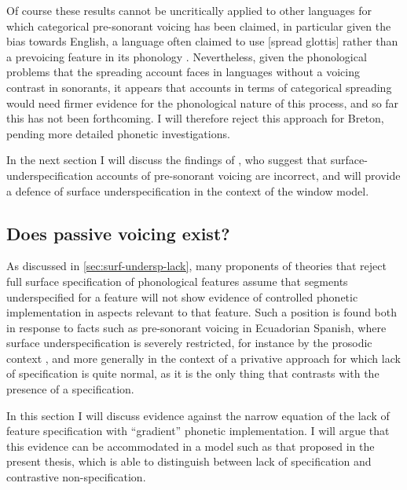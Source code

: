 Of course these results cannot be uncritically applied to other languages for which categorical pre-sonorant voicing has been claimed, in particular given the bias towards English, a language often claimed to use [spread glottis] rather than a prevoicing feature in its phonology \citep[the literature is vast, but \cfm][]{honeybone05,honeyboneng:_lenit_englis,iverson99:_laryn_german,goblirsch05:_lautv_sprac}. Nevertheless, given the phonological problems that the spreading account faces in languages without a voicing contrast in sonorants, it appears that accounts in terms of categorical spreading would need firmer evidence for the phonological nature of this process, and so far this has not been forthcoming. I will therefore reject this approach for Breton, pending more detailed phonetic investigations.

In the next section I will discuss the findings of \citet{strycharczuk11:_explain,strycharczuk11:_phonet}, who suggest that surface\hyp underspecification accounts of pre\hyp sonorant voicing are incorrect, and will provide a defence of surface underspecification in the context of the window model.

\subsection{Does passive voicing exist?}
\label{sec:does-passive-voicing}

As discussed in \cref{sec:surf-undersp-lack}, many proponents of theories that reject full surface specification of phonological features assume that segments underspecified for a feature will not show evidence of controlled phonetic implementation in aspects relevant to that feature. Such a position is found both in response to facts such as pre-sonorant voicing in Ecuadorian Spanish, where surface underspecification is severely restricted, for instance by the prosodic context \citep{colina09:_sibil_ecuad_spanis}, and more generally in the context of a privative approach for which lack of specification is quite normal, as it is the only thing that contrasts with the presence of a specification.

In this section I will discuss evidence against the narrow equation of the lack of feature specification with \enquote{gradient} phonetic implementation. I will argue that this evidence can be accommodated in a model such as that proposed in the present thesis, which is able to distinguish between lack of specification and contrastive non\hyp specification.

